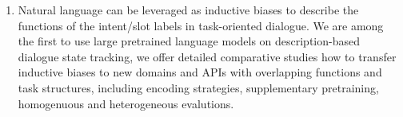 \begin{enumerate}
\item Natural language can be leveraged as inductive biases to
  describe the functions of the intent/slot labels in task-oriented
  dialogue. We are among the first to use large pretrained language
  models on description-based dialogue state tracking, we offer detailed
  comparative studies how to transfer inductive biases to new domains
  and APIs with overlapping functions and task structures, including
  encoding strategies, supplementary pretraining, homogenuous and
  heterogeneous evalutions.
\end{enumerate}


